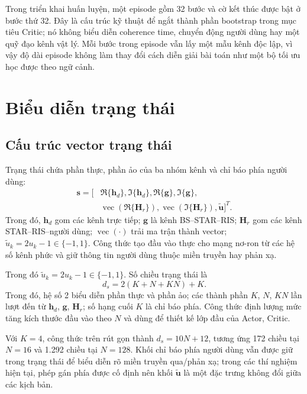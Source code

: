 Trong triển khai huấn luyện, một episode gồm 32 bước và cờ kết thúc được bật ở bước thứ 32. Đây là cấu trúc kỹ thuật để ngắt thành phần bootstrap trong mục tiêu Critic; nó không biểu diễn coherence time, chuyển động người dùng hay một quỹ đạo kênh vật lý. Mỗi bước trong episode vẫn lấy một mẫu kênh độc lập, vì vậy độ dài episode không làm thay đổi cách diễn giải bài toán như một bộ tối ưu học được theo ngữ cảnh.

\section{Biểu diễn trạng thái}
\subsection{Cấu trúc vector trạng thái}
Trạng thái chứa phần thực, phần ảo của ba nhóm kênh và chỉ báo phía người dùng:
\begin{equation}
\begin{split}
 \bm s=[&\Re\{\bm h_d\},\Im\{\bm h_d\},
 \Re\{\bm g\},\Im\{\bm g\},\\
 &\operatorname{vec}(\Re\{\bm H_r\}),
 \operatorname{vec}(\Im\{\bm H_r\}),\widetilde{\bm u}]^T.
\end{split}
 \label{eq:state-vector-ch3}
\end{equation}
Trong đó, $\bm h_d$ gom các kênh trực tiếp; $\bm g$ là kênh BS--STAR--RIS; $\bm H_r$ gom các kênh STAR--RIS--người dùng; $\operatorname{vec}(\cdot)$ trải ma trận thành vector; $\widetilde u_k=2u_k-1\in\{-1,1\}$. Công thức tạo đầu vào thực cho mạng nơ-ron từ các hệ số kênh phức và giữ thông tin người dùng thuộc miền truyền hay phản xạ.

Trong đó $\widetilde u_k=2u_k-1\in\{-1,1\}$. Số chiều trạng thái là
\begin{equation}
 d_s=2(K+N+KN)+K.
 \label{eq:state-dimension-ch3}
\end{equation}
Trong đó, hệ số 2 biểu diễn phần thực và phần ảo; các thành phần $K$, $N$, $KN$ lần lượt đến từ $\bm h_d$, $\bm g$, $\bm H_r$; số hạng cuối $K$ là chỉ báo phía. Công thức định lượng mức tăng kích thước đầu vào theo $N$ và dùng để thiết kế lớp đầu của Actor, Critic.

Với $K=4$, công thức trên rút gọn thành $d_s=10N+12$, tương ứng 172 chiều tại $N=16$ và 1.292 chiều tại $N=128$. Khối chỉ báo phía người dùng vẫn được giữ trong trạng thái để biểu diễn rõ miền truyền qua/phản xạ; trong các thí nghiệm hiện tại, phép gán phía được cố định nên khối $\widetilde{\bm u}$ là một đặc trưng không đổi giữa các kịch bản.

